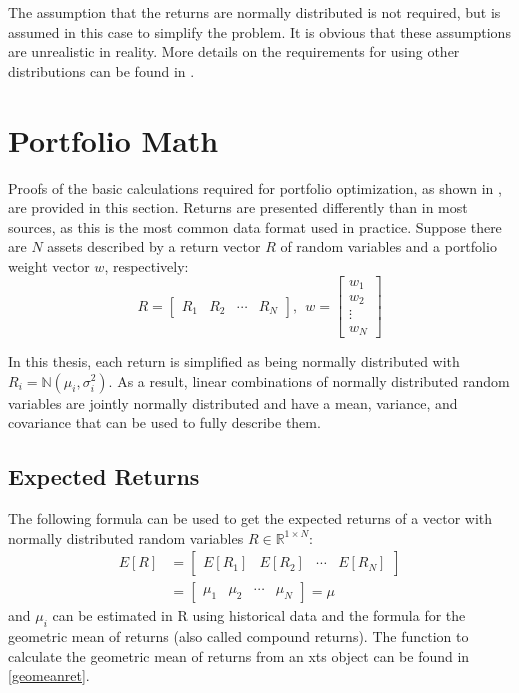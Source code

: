 \documentclass[
  oneside]{book}
\begin{document}
The assumption that the returns are normally distributed is not required, but is assumed in this case to simplify the problem. It is obvious that these assumptions are unrealistic in reality. More details on the requirements for using other distributions can be found in \citep{Mari2005}.

\hypertarget{portfolio-math}{%
\section{Portfolio Math}\label{portfolio-math}}

Proofs of the basic calculations required for portfolio optimization, as shown in \citep{Eric2021}, are provided in this section. Returns are presented differently than in most sources, as this is the most common data format used in practice. Suppose there are \(N\) assets described by a return vector \(R\) of random variables and a portfolio weight vector \(w\), respectively:
\[
  R = 
  \begin{bmatrix}
    R_{1} & R_{2} & \cdots & R_{N}  
 \end{bmatrix}
 , \ \ 
 w = 
  \begin{bmatrix}
    w_{1} \\ 
    w_{2} \\
    \vdots \\
    w_{N}  
 \end{bmatrix}
\]

In this thesis, each return is simplified as being normally distributed with \(R_i = \mathbb{N}(\mu_i, \sigma_i^2)\). As a result, linear combinations of normally distributed random variables are jointly normally distributed and have a mean, variance, and covariance that can be used to fully describe them.

\hypertarget{expected-returns}{%
\subsection{Expected Returns}\label{expected-returns}}

The following formula can be used to get the expected returns of a vector with normally distributed random variables \(R \in \mathbb{R}^{1\times N}\):
\begin{align*}
  E[R] &=
  \begin{bmatrix}
    E[R_{1}] & E[R_{2}] & \cdots & E[R_{N}]  
 \end{bmatrix}\\
 &=
 \begin{bmatrix}
    \mu_{1} & \mu_{2} & \cdots & \mu_{N} 
 \end{bmatrix}
 =
 \mu
\end{align*}
and \(\mu_i\) can be estimated in R using historical data and the formula for the geometric mean of returns (also called compound returns). The function to calculate the geometric mean of returns from an xts object can be found in \ref{geomeanret}.
\end{document}
